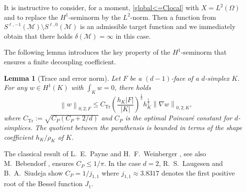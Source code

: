 \documentclass[a4paper]{amsart}
\numberwithin{equation}{section}
\theoremstyle{plain}
\newtheorem{lem}{Lemma}[section]
\theoremstyle{definition}
\begin{document}
It is instructive to consider, for a moment, \eqref{global<=Clocal} with
$X={L^{2}}(\Omega)$ and to replace the ${H^{1}}$-seminorm by the ${L^{{2}}}$-norm.
Then a function from
${S}^{{\ell},-1}({\mathcal{M}})\setminus{S}^{{\ell},0}({\mathcal{M}})$ is an
admissible target function and we immediately obtain that there holds
${\delta}({\mathcal{M}})=\infty$ in this case.

The following lemma introduces the key property of the ${H^{1}}$-seminorm
that ensures a finite decoupling coefficient.
\begin{lem}[Trace and error norm]
\label{L:TraceAndError}
Let ${F}$ be a $(d-1)$-face of a $d$-simplex ${K}$.  For any
$w\in{H^{1}}({K})$ with $\int_{K} w = 0$, there holds
\[
 {{\left\|{{w}}\right\|_{{0,2;{F}}}}}
 \leq
 {{C_\text{Tr}}} \left(
   \frac{h_{K} {\left|{F}\right|}}{{\left|{K}\right|}}
  \right)^{\frac12}
  h_{K}^{\frac12} {{\left\|{{{\nabla} w}}\right\|_{{0,2;{K}}}}},
\]
where ${{C_\text{Tr}}}{:=}\sqrt{C_P(C_P+2/d)}$ and $C_P$ is the optimal Poincar\'e 
constant for $d$-simplices.  The quotient between the parathensis is bounded in 
terms of the shape coefficient $h_{K}/\rho_{K}$ of ${K}$.
\end{lem}

The classical result of L.\ E.\ Payne and H.\ F.\ Weinberger
\cite{Payne.Weinberger:60}, see also M.\ Bebendorf \cite{Bebendorf:03}, 
ensures $C_P\leq1/\pi$.  In the case $d=2$, R.\ S.\ Laugesen and B.\ A.\ 
Siudeja \cite{Laugesen.Siudeja:10} show $C_P=1/{j_{1,1}}$ where 
$j_{1,1}\approx 3.8317$ denotes the first positive root of the Bessel function 
$J_1$. 
\end{document}
